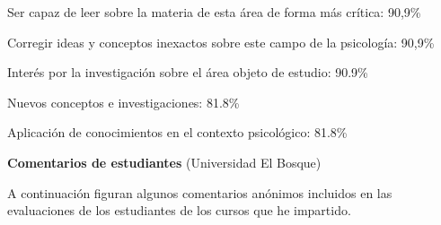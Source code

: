 \documentclass[11pt,a4paper,]{awesome-cv}
\begin{document}
\begin{cventries}
{\begin{cvitems}
\item Ser capaz de leer sobre la materia de esta área de forma más crítica: 90,9\%
\item Corregir ideas y conceptos inexactos sobre este campo de la psicología: 90,9\%
\item Interés por la investigación sobre el área objeto de estudio: 90.9\%
\item Nuevos conceptos e investigaciones:  81.8\%
\item Aplicación de conocimientos en el contexto psicológico: 81.8\%
\end{cvitems}}
\end{cventries}

\blacktriangleright\blacktriangleright\blacktriangleright\space \textbf{Comentarios de estudiantes}
(Universidad El Bosque)

\begin{footnotesize}
A continuación figuran algunos comentarios anónimos incluidos en las evaluaciones de los estudiantes de los cursos que he impartido.
\end{footnotesize}
\end{document}
